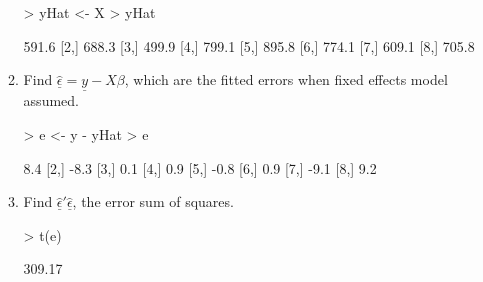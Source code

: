 \documentclass[12pt,a4paper]{paper}
\begin{document}
\begin{enumerate}
\begin{enumerate}
\begin{Schunk}
\begin{Sinput}
> yHat <- X %*% betaHat
> yHat
\end{Sinput}
\begin{Soutput}
      [,1]
[1,] 591.6
[2,] 688.3
[3,] 499.9
[4,] 799.1
[5,] 895.8
[6,] 774.1
[7,] 609.1
[8,] 705.8
\end{Soutput}
\end{Schunk}
\item Find $\underline{\hat{\epsilon}} = \underline{y} - X\beta$, which are the fitted errors when fixed effects model assumed.
\begin{Schunk}
\begin{Sinput}
> e <- y - yHat
> e
\end{Sinput}
\begin{Soutput}
     [,1]
[1,]  8.4
[2,] -8.3
[3,]  0.1
[4,]  0.9
[5,] -0.8
[6,]  0.9
[7,] -9.1
[8,]  9.2
\end{Soutput}
\end{Schunk}
\item Find $\underline{\hat{\epsilon}}'\underline{\hat{\epsilon}}$, the error sum of squares.
\begin{Schunk}
\begin{Sinput}
> t(e) %*% e
\end{Sinput}
\begin{Soutput}
       [,1]
[1,] 309.17
\end{Soutput}
\end{Schunk}
\end{enumerate}

\end{enumerate}
\end{document}
